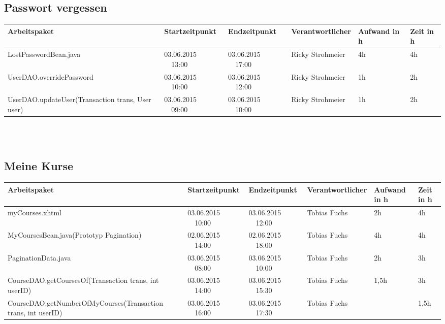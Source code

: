 \begin{landscape}
	\subsection{Passwort vergessen}
	\begin{tabular}{|p{10.3cm}|p{3.2cm}|p{3.2cm}|p{3.5cm}|p{1.7cm}|p{1.5cm}|}
		\hline  \textbf{Arbeitspaket} & \textbf{Startzeitpunkt} & \textbf{Endzeitpunkt} & \textbf{Verantwortlicher}  & \textbf{Aufwand in h} & \textbf{Zeit in h}\\ 
		\hline   LostPasswordBean.java                                & 03.06.2015 \ \ 13:00     & 03.06.2015 \ \ 17:00       & Ricky Strohmeier &      4h       &   4h \\ 
		\hline   UserDAO.overridePassword                                  & 03.06.2015 \ \ 10:00     & 03.06.2015 \ \ 12:00  & Ricky Strohmeier &      1h  &   2h \\ 
		\hline   UserDAO.updateUser(Transaction trans, User user)     & 03.06.2015 \ \ 09:00     & 03.06.2015 \ \ 10:00       & Ricky Strohmeier &      1h       &   2h\\ 
		\hline 
	\end{tabular} \ \\
	\ \\
	
	\subsection{Meine Kurse}
	\begin{tabular}{|p{10.3cm}|p{3.2cm}|p{3.2cm}|p{3.5cm}|p{1.7cm}|p{1.5cm}|}
		\hline  \textbf{Arbeitspaket} & \textbf{Startzeitpunkt} & \textbf{Endzeitpunkt} & \textbf{Verantwortlicher}  & \textbf{Aufwand in h} & \textbf{Zeit in h}\\ 
		\hline   myCourses.xhtml                                       & 03.06.2015 \ \ 10:00       & 03.06.2015  \ \  12:00      & Tobias Fuchs &  2h      &   4h\\
		\hline   MyCoursesBean.java(Prototyp Pagination)               & 02.06.2015 \ \ 14:00       & 02.06.2015  \ \  18:00      & Tobias Fuchs &  4h      &   4h \\
		\hline   PaginationData.java                                   & 03.06.2015 \ \ 08:00       & 03.06.2015  \ \  10:00      & Tobias Fuchs &  2h      &   3h \\
		\hline   CourseDAO.getCoursesOf(Transaction trans, int userID) & 03.06.2015 \ \ 14:00       & 03.06.2015  \ \  15:30      & Tobias Fuchs &  1,5h    &   3h \\
		\hline   CourseDAO.getNumberOfMyCourses(Transaction trans, int userID) & 03.06.2015 \ \ 16:00       & 03.06.2015  \ \  17:30      & Tobias Fuchs &    &   1,5h \\
		\hline 
	\end{tabular} \ \\
	\ \\
	

\end{landscape}
